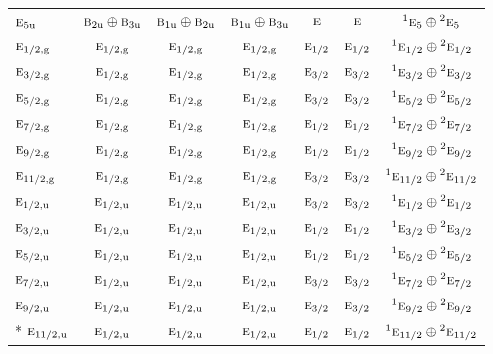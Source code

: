 \documentclass[10pt,a4paper]{article}
\numberwithin{equation}{section}
\newcommand{\irr}[1]{\text{\normalfont\scshape #1}}
\newcommand{\conjpair}[1]{{}^{#1}}
\newcommand{\ptag}[1]{\mathrm{#1}}
\begin{document}
{\begin{longtable}{@{}lcccccc@{}}
$\irr{e}_{5\ptag{u}}$ & $\irr{b}_{2\ptag{u}}\oplus \irr{b}_{3\ptag{u}}$ & $\irr{b}_{1\ptag{u}}\oplus \irr{b}_{2\ptag{u}}$ & $\irr{b}_{1\ptag{u}}\oplus \irr{b}_{3\ptag{u}}$ & $\irr{e}$ & $\irr{e}$ & $\conjpair{1}\irr{e}_{5}\oplus \conjpair{2}\irr{e}_{5}$\\
$\irr{e}_{1/2,\ptag{g}}$ & $\irr{e}_{1/2,\ptag{g}}$ & $\irr{e}_{1/2,\ptag{g}}$ & $\irr{e}_{1/2,\ptag{g}}$ & $\irr{e}_{1/2}$ & $\irr{e}_{1/2}$ & $\conjpair{1}\irr{e}_{1/2}\oplus \conjpair{2}\irr{e}_{1/2}$\\
$\irr{e}_{3/2,\ptag{g}}$ & $\irr{e}_{1/2,\ptag{g}}$ & $\irr{e}_{1/2,\ptag{g}}$ & $\irr{e}_{1/2,\ptag{g}}$ & $\irr{e}_{3/2}$ & $\irr{e}_{3/2}$ & $\conjpair{1}\irr{e}_{3/2}\oplus \conjpair{2}\irr{e}_{3/2}$\\
$\irr{e}_{5/2,\ptag{g}}$ & $\irr{e}_{1/2,\ptag{g}}$ & $\irr{e}_{1/2,\ptag{g}}$ & $\irr{e}_{1/2,\ptag{g}}$ & $\irr{e}_{3/2}$ & $\irr{e}_{3/2}$ & $\conjpair{1}\irr{e}_{5/2}\oplus \conjpair{2}\irr{e}_{5/2}$\\
$\irr{e}_{7/2,\ptag{g}}$ & $\irr{e}_{1/2,\ptag{g}}$ & $\irr{e}_{1/2,\ptag{g}}$ & $\irr{e}_{1/2,\ptag{g}}$ & $\irr{e}_{1/2}$ & $\irr{e}_{1/2}$ & $\conjpair{1}\irr{e}_{7/2}\oplus \conjpair{2}\irr{e}_{7/2}$\\
$\irr{e}_{9/2,\ptag{g}}$ & $\irr{e}_{1/2,\ptag{g}}$ & $\irr{e}_{1/2,\ptag{g}}$ & $\irr{e}_{1/2,\ptag{g}}$ & $\irr{e}_{1/2}$ & $\irr{e}_{1/2}$ & $\conjpair{1}\irr{e}_{9/2}\oplus \conjpair{2}\irr{e}_{9/2}$\\
$\irr{e}_{11/2,\ptag{g}}$ & $\irr{e}_{1/2,\ptag{g}}$ & $\irr{e}_{1/2,\ptag{g}}$ & $\irr{e}_{1/2,\ptag{g}}$ & $\irr{e}_{3/2}$ & $\irr{e}_{3/2}$ & $\conjpair{1}\irr{e}_{11/2}\oplus \conjpair{2}\irr{e}_{11/2}$\\
$\irr{e}_{1/2,\ptag{u}}$ & $\irr{e}_{1/2,\ptag{u}}$ & $\irr{e}_{1/2,\ptag{u}}$ & $\irr{e}_{1/2,\ptag{u}}$ & $\irr{e}_{3/2}$ & $\irr{e}_{3/2}$ & $\conjpair{1}\irr{e}_{1/2}\oplus \conjpair{2}\irr{e}_{1/2}$\\
$\irr{e}_{3/2,\ptag{u}}$ & $\irr{e}_{1/2,\ptag{u}}$ & $\irr{e}_{1/2,\ptag{u}}$ & $\irr{e}_{1/2,\ptag{u}}$ & $\irr{e}_{1/2}$ & $\irr{e}_{1/2}$ & $\conjpair{1}\irr{e}_{3/2}\oplus \conjpair{2}\irr{e}_{3/2}$\\
$\irr{e}_{5/2,\ptag{u}}$ & $\irr{e}_{1/2,\ptag{u}}$ & $\irr{e}_{1/2,\ptag{u}}$ & $\irr{e}_{1/2,\ptag{u}}$ & $\irr{e}_{1/2}$ & $\irr{e}_{1/2}$ & $\conjpair{1}\irr{e}_{5/2}\oplus \conjpair{2}\irr{e}_{5/2}$\\
$\irr{e}_{7/2,\ptag{u}}$ & $\irr{e}_{1/2,\ptag{u}}$ & $\irr{e}_{1/2,\ptag{u}}$ & $\irr{e}_{1/2,\ptag{u}}$ & $\irr{e}_{3/2}$ & $\irr{e}_{3/2}$ & $\conjpair{1}\irr{e}_{7/2}\oplus \conjpair{2}\irr{e}_{7/2}$\\
$\irr{e}_{9/2,\ptag{u}}$ & $\irr{e}_{1/2,\ptag{u}}$ & $\irr{e}_{1/2,\ptag{u}}$ & $\irr{e}_{1/2,\ptag{u}}$ & $\irr{e}_{3/2}$ & $\irr{e}_{3/2}$ & $\conjpair{1}\irr{e}_{9/2}\oplus \conjpair{2}\irr{e}_{9/2}$\\*
$\irr{e}_{11/2,\ptag{u}}$ & $\irr{e}_{1/2,\ptag{u}}$ & $\irr{e}_{1/2,\ptag{u}}$ & $\irr{e}_{1/2,\ptag{u}}$ & $\irr{e}_{1/2}$ & $\irr{e}_{1/2}$ & $\conjpair{1}\irr{e}_{11/2}\oplus \conjpair{2}\irr{e}_{11/2}$\\
\bottomrule\end{longtable}}
\end{document}
